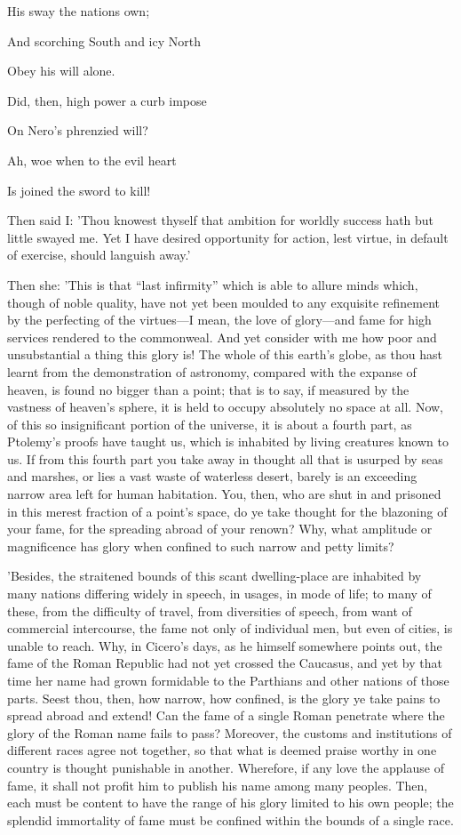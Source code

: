 His sway the nations own;

And scorching South and icy North

Obey his will alone.

Did, then, high power a curb impose

On Nero's phrenzied will?

Ah, woe when to the evil heart

Is joined the sword to kill!


Then said I: 'Thou knowest thyself that ambition for worldly success
hath but little swayed me. Yet I have desired opportunity for action,
lest virtue, in default of exercise, should languish away.'

Then she: 'This is that ``last infirmity'' which is able to allure minds
which, though of noble quality, have not yet been moulded to any
exquisite refinement by the perfecting of the virtues—I mean, the love
of glory—and fame for high services rendered to the commonweal. And yet
consider with me how poor and unsubstantial a thing this glory is! The
whole of this earth's globe, as thou hast learnt from the demonstration
of astronomy, compared with the expanse of heaven, is found no bigger
than a point; that is to say, if measured by the vastness of heaven's
sphere, it is held to occupy absolutely no space at all. Now, of this so
insignificant portion of the universe, it is about a fourth part, as
Ptolemy's proofs have taught us, which is inhabited by living creatures
known to us. If from this fourth part you take away in thought all that
is usurped by seas and marshes, or lies a vast waste of waterless
desert, barely is an exceeding narrow area left for human habitation.
You, then, who are shut in and prisoned in this merest fraction of a
point's space, do ye take thought for the blazoning of your fame, for
the spreading abroad of your renown? Why, what amplitude or magnificence
has glory when confined to such narrow and petty limits?

'Besides, the straitened bounds of this scant dwelling-place are
inhabited by many nations differing widely in speech, in usages, in mode
of life; to many of these, from the difficulty of travel, from
diversities of speech, from want of commercial intercourse, the fame not
only of individual men, but even of cities, is unable to reach. Why, in
Cicero's days, as he himself somewhere points out, the fame of the Roman
Republic had not yet crossed the Caucasus, and yet by that time her
name had grown formidable to the Parthians and other nations of those
parts. Seest thou, then, how narrow, how confined, is the glory ye take
pains to spread abroad and extend! Can the fame of a single Roman
penetrate where the glory of the Roman name fails to pass? Moreover, the
customs and institutions of different races agree not together, so that
what is deemed praise worthy in one country is thought punishable in
another. Wherefore, if any love the applause of fame, it shall not
profit him to publish his name among many peoples. Then, each must be
content to have the range of his glory limited to his own people; the
splendid immortality of fame must be confined within the bounds of a
single race.

